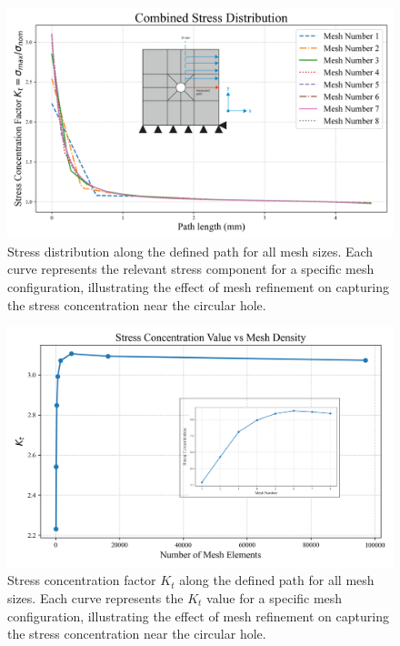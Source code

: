 \documentclass[12pt]{article}
\begin{document}
\begin{figure}[H]
    \centering
    \includegraphics[width=1\textwidth]{images/StressConc.png}
    \caption{Stress distribution along the defined path 
    for all mesh sizes. Each curve represents the relevant stress 
    component for a specific mesh configuration, illustrating the 
    effect of mesh refinement on capturing the stress concentration 
    near the circular hole.}
    \label{fig:CombinedStressDistribution}
\end{figure}

\begin{figure}[H]
    \centering
    \includegraphics[width=1\textwidth]{images/Kt.png}
    \caption{Stress concentration factor $K_t$ along the defined path 
    for all mesh sizes. Each curve represents the $K_t$ value for a specific mesh configuration, illustrating the 
    effect of mesh refinement on capturing the stress concentration 
    near the circular hole.}
    \label{fig:CombinedStressDistribution}
\end{figure}
\end{document}
